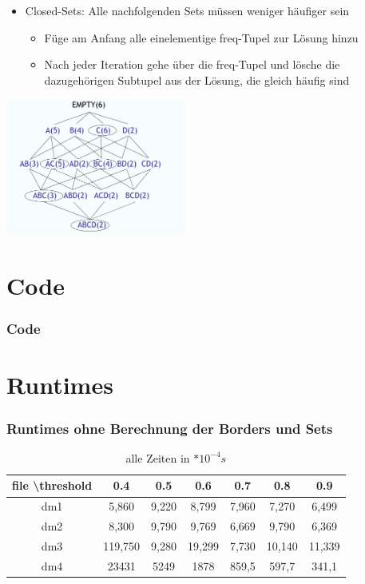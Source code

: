 \documentclass{beamer}
\begin{document}
\begin{frame}
	\begin{itemize}			
		\item Closed-Sets: Alle nachfolgenden Sets müssen weniger häufiger sein
		\begin{itemize}
			\item Füge am Anfang alle einelementige freq-Tupel zur Lösung hinzu
			\item Nach jeder Iteration gehe über die freq-Tupel und lösche die dazugehörigen Subtupel aus der Lösung, die gleich häufig sind
		\end{itemize}
	\end{itemize}
		\centering
		\includegraphics[height=4.5cm]{pictures/closed_sets.png}
\end{frame}

\section{Code}
\begin{frame} %
	\frametitle{Code} %
	
\end{frame}






\section{Runtimes}
\begin{frame} %
	\frametitle{Runtimes ohne Berechnung der Borders und Sets} %
	\begin{table}    
		\centering    
		\begin{tabular}{|c|c|c|c|c|c|c|}    
			\hline file \textbackslash threshold& 0.4& 0.5& 0.6& 0.7& 0.8& 0.9\\
			\hline dm1& 5,860& 9,220& 8,799& 7,960& 7,270& 6,499\\
			\hline dm2& 8,300& 9,790& 9,769& 6,669& 9,790& 6,369\\
			\hline dm3& 119,750& 9,280& 19,299& 7,730& 10,140& 11,339\\
			\hline dm4& 23431& 5249& 1878& 859,5& 597,7& 341,1\\
			\hline 
		\end{tabular}    
		\caption{alle Zeiten in $*10^{-4}s$}    
	\end{table}    
\end{frame}
\end{document}
